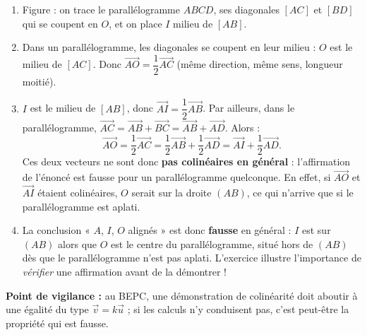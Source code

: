 \documentclass[11pt]{article}
\begin{document}
\begin{corrige}
\begin{enumerate}
\item Figure : on trace le parallélogramme $ABCD$, ses diagonales $[AC]$ et $[BD]$ qui se coupent en $O$, et on place $I$ milieu de $[AB]$.
\item Dans un parallélogramme, les diagonales se coupent en leur milieu : $O$ est le milieu de $[AC]$. Donc $\overrightarrow{AO} = \dfrac{1}{2}\overrightarrow{AC}$ (même direction, même sens, longueur moitié).
\item $I$ est le milieu de $[AB]$, donc $\overrightarrow{AI} = \dfrac{1}{2}\overrightarrow{AB}$. Par ailleurs, dans le parallélogramme, $\overrightarrow{AC} = \overrightarrow{AB} + \overrightarrow{BC} = \overrightarrow{AB} + \overrightarrow{AD}$. Alors :
\[ \overrightarrow{AO} = \dfrac{1}{2}\overrightarrow{AC} = \dfrac{1}{2}\overrightarrow{AB} + \dfrac{1}{2}\overrightarrow{AD} = \overrightarrow{AI} + \dfrac{1}{2}\overrightarrow{AD}. \]
Ces deux vecteurs ne sont donc \textbf{pas colinéaires en général} : l'affirmation de l'énoncé est fausse pour un parallélogramme quelconque. En effet, si $\overrightarrow{AO}$ et $\overrightarrow{AI}$ étaient colinéaires, $O$ serait sur la droite $(AB)$, ce qui n'arrive que si le parallélogramme est aplati.
\item La conclusion « $A$, $I$, $O$ alignés » est donc \textbf{fausse} en général : $I$ est sur $(AB)$ alors que $O$ est le centre du parallélogramme, situé hors de $(AB)$ dès que le parallélogramme n'est pas aplati. L'exercice illustre l'importance de \emph{vérifier} une affirmation avant de la démontrer !
\end{enumerate}
\textbf{Point de vigilance :} au BEPC, une démonstration de colinéarité doit aboutir à une égalité du type $\vec{v} = k\vec{u}$ ; si les calculs n'y conduisent pas, c'est peut-être la propriété qui est fausse.
\end{corrige}
\end{document}
